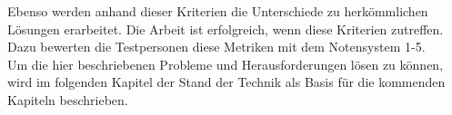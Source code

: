 Ebenso werden anhand dieser Kriterien die Unterschiede zu herkömmlichen Lösungen erarbeitet. Die Arbeit ist erfolgreich, wenn diese Kriterien zutreffen. Dazu bewerten die Testpersonen diese Metriken mit dem Notensystem 1-5.\\ 

Um die hier beschriebenen Probleme und Herausforderungen lösen zu können, wird im folgenden Kapitel der Stand der Technik als Basis für die kommenden Kapiteln beschrieben.
